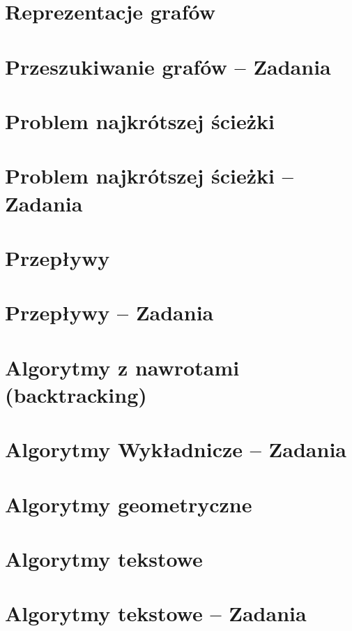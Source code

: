 \section{Reprezentacje grafów}

\section{Przeszukiwanie grafów -- Zadania}

\section{Problem najkrótszej ścieżki}

\section{Problem najkrótszej ścieżki -- Zadania}

\section{Przepływy}

\section{Przepływy -- Zadania}

\section{Algorytmy z nawrotami (backtracking)}
\section{Algorytmy Wykładnicze -- Zadania}

\section{Algorytmy geometryczne}

\section{Algorytmy tekstowe}

\section{Algorytmy tekstowe -- Zadania}


